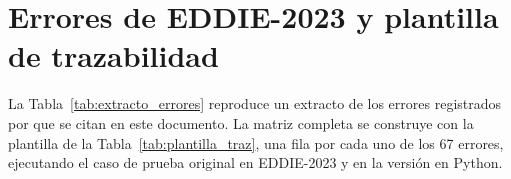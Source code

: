 
\chapter{Errores de EDDIE-2023 y plantilla de trazabilidad}
\label{an:errores}

La Tabla~\ref{tab:extracto_errores} reproduce un extracto de los errores registrados por \citet{ibaceta2023} que se citan en este documento. La matriz completa se construye con la plantilla de la Tabla~\ref{tab:plantilla_traz}, una fila por cada uno de los 67 errores, ejecutando el caso de prueba original en EDDIE-2023 y en la versión en Python.

